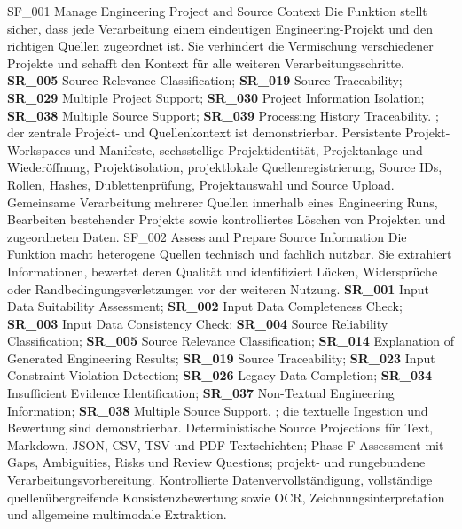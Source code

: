 \featureprofile
{SF\_001}
{Manage Engineering Project and Source Context}
{Die Funktion stellt sicher, dass jede Verarbeitung einem eindeutigen
Engineering-Projekt und den richtigen Quellen zugeordnet ist. Sie verhindert
die Vermischung verschiedener Projekte und schafft den Kontext für alle
weiteren Verarbeitungsschritte.}
{\textbf{SR\_005} Source Relevance Classification;
\textbf{SR\_019} Source Traceability;
\textbf{SR\_029} Multiple Project Support;
\textbf{SR\_030} Project Information Isolation;
\textbf{SR\_038} Multiple Source Support;
\textbf{SR\_039} Processing History Traceability.}
{; der zentrale Projekt- und
Quellenkontext ist demonstrierbar.}
{Persistente Projekt-Workspaces und Manifeste, sechsstellige Projektidentität,
Projektanlage und Wiederöffnung, Projektisolation, projektlokale
Quellenregistrierung, Source IDs, Rollen, Hashes, Dublettenprüfung,
Projektauswahl und Source Upload.}
{Gemeinsame Verarbeitung mehrerer Quellen innerhalb eines Engineering Runs,
Bearbeiten bestehender Projekte sowie kontrolliertes Löschen von Projekten und
zugeordneten Daten.}
\pagebreak
\featureprofile
{SF\_002}
{Assess and Prepare Source Information}
{Die Funktion macht heterogene Quellen technisch und fachlich nutzbar. Sie
extrahiert Informationen, bewertet deren Qualität und identifiziert Lücken,
Widersprüche oder Randbedingungsverletzungen vor der weiteren Nutzung.}
{\textbf{SR\_001} Input Data Suitability Assessment;
\textbf{SR\_002} Input Data Completeness Check;
\textbf{SR\_003} Input Data Consistency Check;
\textbf{SR\_004} Source Reliability Classification;
\textbf{SR\_005} Source Relevance Classification;
\textbf{SR\_014} Explanation of Generated Engineering Results;
\textbf{SR\_019} Source Traceability;
\textbf{SR\_023} Input Constraint Violation Detection;
\textbf{SR\_026} Legacy Data Completion;
\textbf{SR\_034} Insufficient Evidence Identification;
\textbf{SR\_037} Non-Textual Engineering Information;
\textbf{SR\_038} Multiple Source Support.}
{; die textuelle Ingestion und
Bewertung sind demonstrierbar.}
{Deterministische Source Projections für Text, Markdown, JSON, CSV, TSV und
PDF-Textschichten; Phase-F-Assessment mit Gaps, Ambiguities, Risks und
Review Questions; projekt- und rungebundene Verarbeitungsvorbereitung.}
{Kontrollierte Datenvervollständigung, vollständige
quellenübergreifende Konsistenzbewertung sowie OCR,
Zeichnungsinterpretation und allgemeine multimodale Extraktion.}

